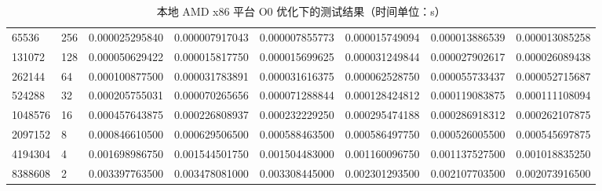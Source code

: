 \documentclass[a4paper]{article}
\begin{document}
\begin{table}[]
{\begin{tabular}{llllllll}
      65536   & 256     & 0.000025295840 & 0.000007917043 & 0.000007855773  & 0.000015749094 & 0.000013886539 & 0.000013085258 \\
      131072  & 128     & 0.000050629422 & 0.000015817750 & 0.000015699625  & 0.000031249844 & 0.000027902617 & 0.000026089438 \\
      262144  & 64      & 0.000100877500 & 0.000031783891 & 0.000031616375  & 0.000062528750 & 0.000055733437 & 0.000052715687 \\
      524288  & 32      & 0.000205755031 & 0.000070265656 & 0.000071288844  & 0.000128424812 & 0.000119083875 & 0.000111108094 \\
      1048576 & 16      & 0.000457643875 & 0.000226808937 & 0.000232229250  & 0.000295474188 & 0.000286918312 & 0.000262107875 \\
      2097152 & 8       & 0.000846610500 & 0.000629506500 & 0.000588463500  & 0.000586497750 & 0.000526005500 & 0.000545697875 \\
      4194304 & 4       & 0.001698986750 & 0.001544501750 & 0.001504483000  & 0.001160096750 & 0.001137527500 & 0.001018835250 \\
      8388608 & 2       & 0.003397763500 & 0.003478081000 & 0.003308445000  & 0.002301293500 & 0.002107703500 & 0.002073916500
    \end{tabular}%
  }
  \caption{本地 AMD x86 平台 O0 优化下的测试结果（时间单位：s）}
  \label{tab:x86-O0-test}
\end{table}
\end{document}
